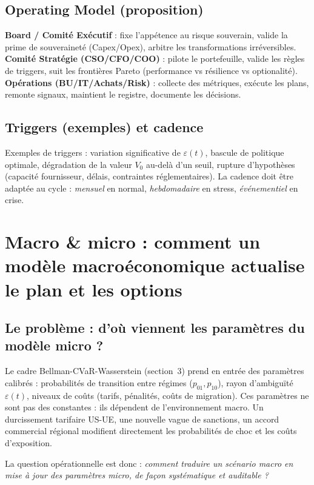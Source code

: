 \documentclass[11pt,a4paper]{article}
\begin{document}
\subsection{Operating Model (proposition)}
\textbf{Board / Comité Exécutif} : fixe l’appétence au risque souverain, valide la prime de souveraineté (Capex/Opex), arbitre les transformations irréversibles.\\
\textbf{Comité Stratégie (CSO/CFO/COO)} : pilote le portefeuille, valide les règles de triggers, suit les frontières Pareto (performance vs résilience vs optionalité).\\
\textbf{Opérations (BU/IT/Achats/Risk)} : collecte des métriques, exécute les plans, remonte signaux, maintient le registre, documente les décisions.

\subsection{Triggers (exemples) et cadence}
Exemples de triggers : variation significative de \(\varepsilon(t)\), bascule de politique optimale, dégradation de la valeur \(V_0\) au-delà d’un seuil, rupture d’hypothèses (capacité fournisseur, délais, contraintes réglementaires).
La cadence doit être adaptée au cycle : \emph{mensuel} en normal, \emph{hebdomadaire} en stress, \emph{événementiel} en crise.

\section{Macro \& micro : comment un modèle macroéconomique actualise le plan et les options}

\subsection{Le problème : d’où viennent les paramètres du modèle micro ?}
Le cadre Bellman-CVaR-Wasserstein (section~3) prend en entrée des paramètres calibrés :
probabilités de transition entre régimes (\(p_{01}, p_{10}\)),
rayon d’ambiguïté \(\varepsilon(t)\),
niveaux de coûts (tarifs, pénalités, coûts de migration).
Ces paramètres ne sont pas des constantes : ils dépendent de l’environnement macro.
Un durcissement tarifaire US-UE, une nouvelle vague de sanctions, un accord commercial régional modifient directement les probabilités de choc et les coûts d’exposition.

La question opérationnelle est donc : \emph{comment traduire un scénario macro en mise à jour des paramètres micro, de façon systématique et auditable ?}
\end{document}
